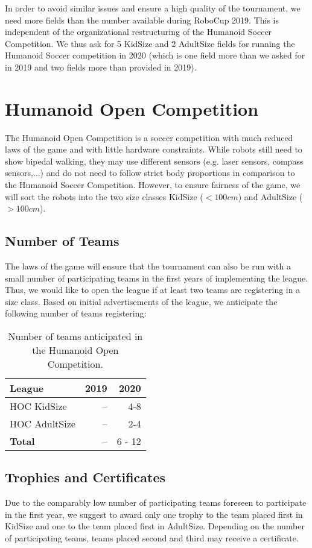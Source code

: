 \documentclass{article}
\begin{document}
In order to avoid similar issues and ensure a high quality of the tournament, we need more fields than the number available during RoboCup 2019. This is independent of the organizational restructuring of the Humanoid Soccer Competition. We thus ask for 5 KidSize and 2 AdultSize fields for running the Humanoid Soccer competition in 2020 (which is one field more than we asked for in 2019 and two fields more than provided in 2019).

\section{Humanoid Open Competition}

The Humanoid Open Competition is a soccer competition with much reduced laws of the game and with little hardware constraints. While robots still need to show bipedal walking, they may use different sensors (e.g. laser sensors, compass sensors,...) and do not need to follow strict body proportions in comparison to the Humanoid Soccer Competition. However, to ensure fairness of the game, we will sort the robots into the two size classes KidSize ($< 100 cm$) and AdultSize ($> 100 cm$). 

\subsection{Number of Teams}
The laws of the game will ensure that the tournament can also be run with a small number of participating teams in the first years of implementing the league. Thus, we would like to open the league if at least two teams are registering in a size class. Based on initial advertisements of the league, we anticipate the following number of teams registering:

\begin{table}[h]
  \centering
  \begin{tabular}{l | r | r}
    League & 2019 & 2020\\
    \hline
    HOC KidSize & -- & 4-8\\
    HOC AdultSize & -- & 2-4\\ 
    \hline
    \textbf{Total} & -- & 6 - 12
  \end{tabular}
  \caption{Number of teams anticipated in the Humanoid Open Competition.}

\end{table}

\subsection{Trophies and Certificates}
Due to the comparably low number of participating teams foreseen to participate in the first year, we suggest to award only one trophy to the team placed first in KidSize and one to the team placed first in AdultSize. Depending on the number of participating teams, teams placed second and third may receive a certificate.
\end{document}
